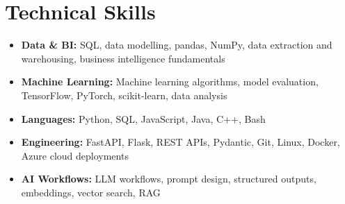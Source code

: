 \documentclass[a4paper,10pt]{article}
\begin{document}
\section*{Technical Skills}
\begin{itemize}
    \item \textbf{Data \& BI:} SQL, data modelling, pandas, NumPy, data extraction and warehousing, business intelligence fundamentals
    \item \textbf{Machine Learning:} Machine learning algorithms, model evaluation, TensorFlow, PyTorch, scikit-learn, data analysis
    \item \textbf{Languages:} Python, SQL, JavaScript, Java, C++, Bash
    \item \textbf{Engineering:} FastAPI, Flask, REST APIs, Pydantic, Git, Linux, Docker, Azure cloud deployments
    \item \textbf{AI Workflows:} LLM workflows, prompt design, structured outputs, embeddings, vector search, RAG
\end{itemize}
\end{document}
